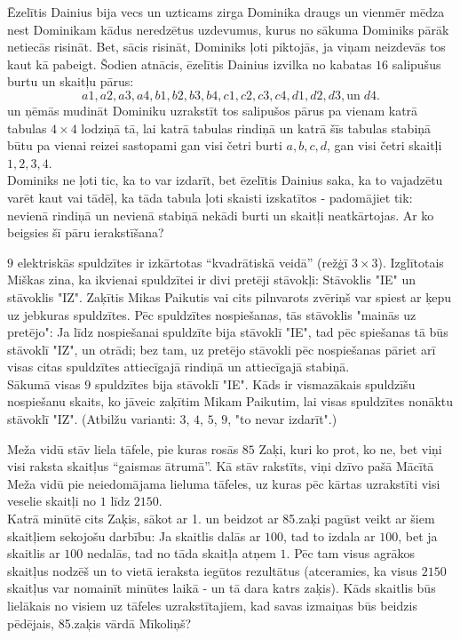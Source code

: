 \documentclass[11pt]{article}
\begin{document}
\begin{problem}[LT.58.2011.5to6.3]
Ēzelītis Dainius bija vecs un uzticams zirga Dominika draugs un 
vienmēr mēdza nest Dominikam kādus neredzētus uzdevumus, kurus
no sākuma Dominiks pārāk netiecās risināt. 
Bet, sācis risināt, Dominiks ļoti piktojās, ja viņam neizdevās tos kaut kā pabeigt.
Šodien atnācis, ēzelītis Dainius izvilka no kabatas $16$ salipušus burtu un 
skaitļu pārus: 
$$a1, a2, a3, a4, b1, b2, b3, b4, c1, c2, c3, c4, d1, d2, d3,\text{un}\;d4.$$
un ņēmās mudināt Dominiku uzrakstīt tos salipušos pārus pa vienam katrā tabulas
$4 \times 4$ lodziņā tā, lai katrā tabulas rindiņā un katrā šīs tabulas stabiņā
būtu pa vienai reizei sastopami gan visi četri burti $a,b,c,d$, gan visi 
četri skaitļi $1,2,3,4$.\\
Dominiks ne ļoti tic, ka to var izdarīt, bet ēzelītis Dainius saka, ka to 
vajadzētu varēt kaut vai tādēļ, ka tāda tabula ļoti skaisti izskatītos - 
padomājiet tik: nevienā rindiņā un nevienā stabiņā nekādi burti un skaitļi 
neatkārtojas. Ar ko beigsies šī pāru ierakstīšana?
\end{problem}

\begin{problem}[LT.58.2014.5to6.2]
$9$ elektriskās spuldzītes ir izkārtotas ``kvadrātiskā veidā'' (režģī $3 \times 3$). 
Izglītotais Miškas zina, ka ikvienai spuldzītei ir divi pretēji stāvokļi: 
Stāvoklis "IE" un stāvoklis "IZ". Zaķītis Mikas Paikutis vai cits pilnvarots 
zvēriņš var spiest ar ķepu uz jebkuras spuldzītes. 
Pēc spuldzītes nospiešanas, tās stāvoklis "mainās uz pretējo": Ja līdz nospiešanai 
spuldzīte bija stāvoklī "IE", tad pēc spiešanas tā būs stāvoklī "IZ", un otrādi; 
bez tam, uz pretējo stāvokli pēc nospiešanas pāriet arī visas citas spuldzītes attiecīgajā rindiņā 
un attiecīgajā stabiņā.\\
Sākumā visas $9$ spuldzītes bija stāvoklī "IE". Kāds ir vismazākais spuldzīšu nospiešanu skaits, 
ko jāveic zaķītim Mikam Paikutim, lai visas spuldzītes nonāktu stāvoklī "IZ". 
(Atbilžu varianti: $3$, $4$, $5$, $9$, "to nevar izdarīt".)
\end{problem}


\begin{problem}[LT.58.2014.7to8.5]
Meža vidū stāv liela tāfele, pie kuras rosās $85$ Zaķi, kuri ko prot, ko ne, 
bet viņi visi raksta skaitļus ``gaismas ātrumā''. Kā stāv rakstīts, viņi dzīvo pašā 
Mācītā Meža vidū pie neiedomājama lieluma tāfeles, uz kuras pēc kārtas 
uzrakstīti visi veselie skaitļi no $1$ līdz $2150$.\\
Katrā minūtē cits Zaķis, sākot ar 1. un beidzot ar 85.zaķi pagūst veikt 
ar šiem skaitļiem sekojošu darbību: Ja skaitlis dalās ar $100$, tad to izdala ar $100$, 
bet ja skaitlis ar $100$ nedalās, tad no tāda skaitļa atņem $1$. 
Pēc tam visus agrākos skaitļus nodzēš un to vietā ieraksta iegūtos rezultātus 
(atceramies, ka visus $2150$ skaitļus var nomainīt minūtes laikā - un tā dara katrs zaķis). 
Kāds skaitlis būs lielākais no visiem uz tāfeles uzrakstītajiem, 
kad savas izmaiņas būs beidzis pēdējais, 85.zaķis vārdā Mīkoliņš?
\end{problem}
\end{document}
